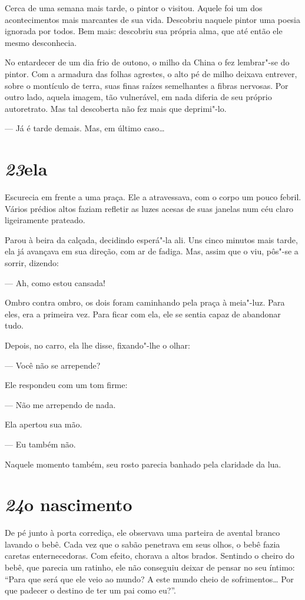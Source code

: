 Cerca de uma semana mais tarde, o pintor o visitou. Aquele foi um dos
acontecimentos mais marcantes de sua vida. Descobriu naquele pintor uma
poesia ignorada por todos. Bem mais: descobriu sua própria alma, que
até então ele mesmo desconhecia.

No entardecer de um dia frio de outono, o milho da China o fez
lembrar"-se do pintor. Com a armadura das folhas agrestes, o alto pé de
milho deixava entrever, sobre o montículo de terra, suas finas raízes
semelhantes a fibras nervosas. Por outro lado, aquela imagem, tão
vulnerável, em nada diferia de seu próprio autoretrato. Mas tal
descoberta não fez mais que deprimi"-lo.

--- Já é tarde demais. Mas, em último caso\ldots{}

\section*{\textit{23}\es ela}

Escurecia em frente a uma praça. Ele a atravessava, com o corpo um pouco
febril. Vários prédios altos faziam refletir as luzes acesas de suas
janelas num céu claro ligeiramente prateado.

Parou à beira da calçada, decidindo esperá"-la ali. Uns cinco minutos
mais tarde, ela já avançava em sua direção, com ar de fadiga. Mas,
assim que o viu, pôs"-se a sorrir, dizendo:

--- Ah, como estou cansada!

Ombro contra ombro, os dois foram caminhando pela praça à meia"-luz. Para
eles, era a primeira vez. Para ficar com ela, ele se sentia capaz de
abandonar tudo.

Depois, no carro, ela lhe disse, fixando"-lhe o olhar:

 --- Você não se arrepende?

Ele respondeu com um tom firme:

--- Não me arrependo de nada.

Ela apertou sua mão.

--- Eu também não.

Naquele momento também, seu rosto parecia banhado pela claridade da lua.

\section*{\textit{24}\es o nascimento}

De pé junto à porta corrediça, ele observava uma parteira de avental
branco lavando o bebê. Cada vez que o sabão penetrava em seus olhos, o
bebê fazia caretas enternecedoras. Com efeito, chorava a altos brados.
Sentindo o cheiro do bebê, que parecia um ratinho, ele não conseguiu
deixar de pensar no seu íntimo: ``Para que será que ele veio ao mundo? A
este mundo cheio de sofrimentos\ldots{} Por que padecer o destino de ter um
pai como eu?''.

